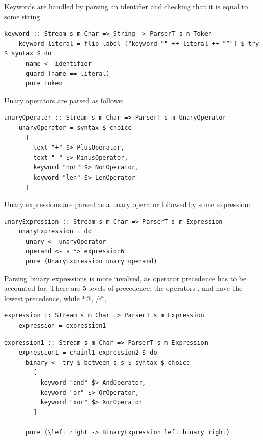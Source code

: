 \documentclass[UdineBachThesis,american,11pt,draft]{PhdThesis}
\begin{document}
  Keywords are handled by parsing an identifier and checking that it is equal to
  some string.

  \begin{lstlisting}[gobble=4,basicstyle=\ttfamily\small]
    keyword :: Stream s m Char => String -> ParserT s m Token
    keyword literal = flip label ("keyword “" ++ literal ++ "”") $ try $ syntax $ do
      name <- identifier
      guard (name == literal)
      pure Token
  \end{lstlisting}

  Unary operators are parsed as follows:

  \begin{lstlisting}[gobble=4,basicstyle=\ttfamily\small]
    unaryOperator :: Stream s m Char => ParserT s m UnaryOperator
    unaryOperator = syntax $ choice
      [
        text "+" $> PlusOperator,
        text "-" $> MinusOperator,
        keyword "not" $> NotOperator,
        keyword "len" $> LenOperator
      ]
  \end{lstlisting}

  Unary expressions are parsed as a unary operator followed by some expression:

  \begin{lstlisting}[gobble=4,basicstyle=\ttfamily\small]
    unaryExpression :: Stream s m Char => ParserT s m Expression
    unaryExpression = do
      unary <- unaryOperator
      operand <- s *> expression6
      pure (UnaryExpression unary operand)
  \end{lstlisting}

  Parsing binary expressions is more involved, as operator precedence has to be
  accounted for. There are 5 levels of precedence: the operators \lstinline@and@,
  \lstinline@or@ and \lstinline@xor@ have the lowest precedence, while
  \lstinline@*@, \lstinline@/@, \lstinline@%@ have the highest.

  \begin{lstlisting}[gobble=4,basicstyle=\ttfamily\small]
    expression :: Stream s m Char => ParserT s m Expression
    expression = expression1
  \end{lstlisting}

  \begin{lstlisting}[gobble=4,basicstyle=\ttfamily\small]
    expression1 :: Stream s m Char => ParserT s m Expression
    expression1 = chainl1 expression2 $ do
      binary <- try $ between s s $ syntax $ choice
        [
          keyword "and" $> AndOperator,
          keyword "or" $> OrOperator,
          keyword "xor" $> XorOperator
        ]

      pure (\left right -> BinaryExpression left binary right)
  \end{lstlisting}
\end{document}
